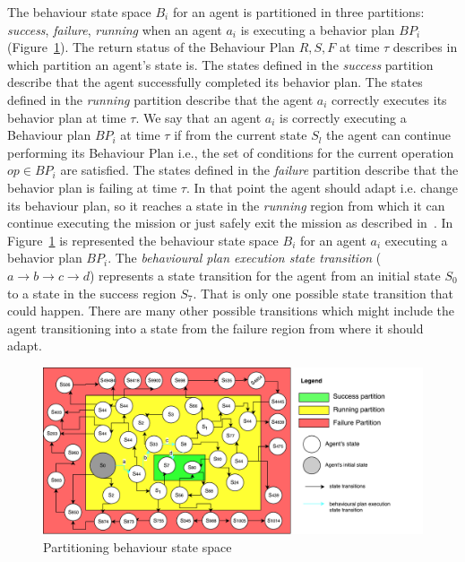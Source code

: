 \documentclass[journal]{IEEEtran}
\theoremstyle{definition}
\newcommand\patrizio[1]{\nb{Patrizio}{#1}}
\begin{document}
The behaviour state space $B_i$ for an agent is partitioned in three partitions: \textit{success}, \textit{failure}, \textit{running} when an agent $a_i$ is executing a behavior plan $BP_i$ (Figure~\ref{fig:BS}). The return status of the Behaviour Plan ${R, S, F}$ at time $\tau$ describes in which partition an agent's state is. The states defined in the \textit{success} partition describe that the agent successfully completed its behavior plan. 
The states defined in the \textit{running} partition describe that the agent $a_i$ correctly executes its behavior plan at time $\tau$. We say that an agent $a_i$ is correctly executing a Behaviour plan $BP_i$ at time $\tau$ if from the current state $S_l$ the agent can continue performing its Behaviour Plan i.e., the set of conditions for the current operation $op \in BP_i$ are satisfied. %
The states defined in the \textit{failure} partition describe that the behavior plan is failing at time $\tau$. In that point the agent should adapt i.e. change its behaviour plan, so it reaches a state in the \textit{running} region from which it can continue executing the mission or just safely exit the mission as described in~\cite{di2013engineering}. In Figure~\ref{fig:BS} is represented the behaviour state space $B_i$ for an agent $a_i$ executing a behavior plan $BP_i$. The \textit{behavioural plan execution state transition} ($a \rightarrow b \rightarrow c \rightarrow d$) represents a state transition for the agent from an initial state  $S_0$ to a state in the success region $S_7$. That is only one possible state transition that could happen. There are many other possible transitions which might include the agent transitioning into a state from the failure region from where it should adapt.




\begin{figure}[h]
\includegraphics[width=.5\textwidth]{Figures/BS5.pdf}
\caption{Partitioning behaviour state space}\label{fig:BS}
\end{figure}
\end{document}
